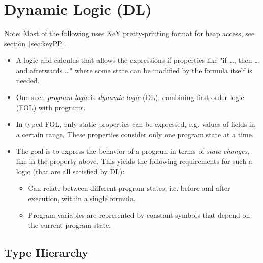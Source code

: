 \chapter{Dynamic Logic (DL)}
\label{c:dl}

Note: Most of the following uses KeY pretty-printing format for heap access, see section~\ref{sec:keyPP}.

\begin{itemize}
	\item A logic and calculus that allows the expressions if properties like "if \dots, then \dots and afterwards \dots" where some state can be modified by the formula itself is needed.
	\item One such \textit{program logic} is \textit{dynamic logic} (DL), combining first-order logic (FOL) with programs.
	\item In typed FOL, only static properties can be expressed, e.g. values of fields in a certain range. These properties consider only one program state at a time.
	\item The goal is to express the behavior of a program in terms of \textit{state changes}, like in the property above. This yields the following requirements for such a logic (that are all satisfied by DL):
		\begin{itemize}
			\item Can relate between different program states, i.e. before and after execution, within a single formula.
			\item Program variables are represented by constant symbols that depend on the current program state.
		\end{itemize}
\end{itemize}

\section{Type Hierarchy}

